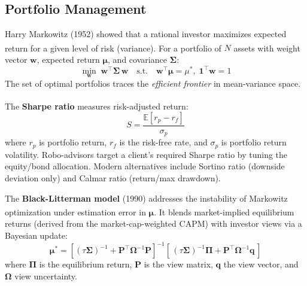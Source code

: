 \subsection{Portfolio Management}

\begin{tcbitemize}[ skin=sectionraster ]

    \tcbitem[title=Modern Portfolio Theory (Markowitz), raster multicolumn=3]
    Harry Markowitz (1952) showed that a rational investor maximizes expected return for a given level of risk (variance)\textsuperscript{\cite[][p.~127]{jansenMachineLearningAlgorithmic2020}}.
    For a portfolio of $N$ assets with weight vector $\mathbf{w}$, expected return $\boldsymbol{\mu}$, and covariance $\boldsymbol{\Sigma}$:
    \begin{equation}
        \min_{\mathbf{w}}\; \mathbf{w}^\top \boldsymbol{\Sigma}\, \mathbf{w} \quad \text{s.t.} \quad \mathbf{w}^\top \boldsymbol{\mu} = \mu^*, \; \mathbf{1}^\top \mathbf{w} = 1
    \end{equation}
    The set of optimal portfolios traces the \emph{efficient frontier} in mean-variance space.

    \tcbitem[title=Sharpe Ratio and Risk-Adjusted Performance, raster multicolumn=3]
    The \textbf{Sharpe ratio} measures risk-adjusted return\textsuperscript{\cite[][p.~122]{jansenMachineLearningAlgorithmic2020}}:
    \begin{equation}
        S = \frac{\mathbb{E}[r_p - r_f]}{\sigma_p}
    \end{equation}
    where $r_p$ is portfolio return, $r_f$ is the risk-free rate, and $\sigma_p$ is portfolio return volatility.
    Robo-advisors target a client's required Sharpe ratio by tuning the equity/bond allocation.
    Modern alternatives include Sortino ratio (downside deviation only) and Calmar ratio (return/max drawdown).

    \tcbitem[title=Black-Litterman Model, raster multicolumn=3]
    The \textbf{Black-Litterman model} (1990) addresses the instability of Markowitz optimization under estimation error in $\boldsymbol{\mu}$\textsuperscript{\cite[][pp.~131--132]{jansenMachineLearningAlgorithmic2020}}.
    It blends market-implied equilibrium returns (derived from the market-cap-weighted CAPM) with investor views via a Bayesian update:
    \begin{equation}
        \boldsymbol{\mu}^* = [(\tau \boldsymbol{\Sigma})^{-1} + \mathbf{P}^\top \boldsymbol{\Omega}^{-1} \mathbf{P}]^{-1}[\,(\tau \boldsymbol{\Sigma})^{-1} \boldsymbol{\Pi} + \mathbf{P}^\top \boldsymbol{\Omega}^{-1} \mathbf{q}\,]
    \end{equation}
    where $\boldsymbol{\Pi}$ is the equilibrium return, $\mathbf{P}$ is the view matrix, $\mathbf{q}$ the view vector, and $\boldsymbol{\Omega}$ view uncertainty.


\end{tcbitemize}
